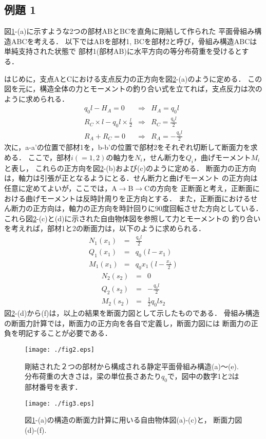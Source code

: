 ﻿\documentclass[10pt,a4j]{jbook}
\begin{document}
\subsection{例題 1}
図\ref{fig:fig12_2}-(a)に示すような2つの部材ABとBCを直角に剛結して作られた
平面骨組み構造ABCを考える．
以下ではABを部材1, BCを部材2と呼び，骨組み構造ABCは単純支持された状態で
部材1(部材AB)に水平方向の等分布荷重を受けるとする．

はじめに，支点AとCにおける支点反力の正方向を図\ref{fig:fig12_3}-(a)のように定める．
この図を元に，構造全体の力とモーメントの釣り合い式を立てれば，支点反力は次のように求められる．
\begin{eqnarray}
	q_0l-H_A=0 & \Rightarrow & H_A=q_0l \\ 
	R_C\times l -q_0l \times \frac{l}{2}
	 & \Rightarrow & R_C=\frac{q_0l}{2} \\ 
	R_A+R_C=0 &\Rightarrow& R_A=-\frac{q_0l}{2}
\end{eqnarray}
次に，a-a'の位置で部材1を，b-b'の位置で部材2をそれぞれ切断して断面力を求める．
ここで，部材$i(=1,2)$の軸力を$N_i$，せん断力を$Q_i$，曲げモーメント$M_i$と表し，
これらの正方向を図\ref{fig:fig12_3}-(b)および(c)のように定める．
断面力の正方向は，軸力は引張が正となるようにとる．せん断力と曲げモーメント
の正方向は任意に定めてよいが，ここでは，A$\rightarrow$B$\rightarrow$Cの方向を
正断面と考え，正断面における曲げモーメントは反時計周りを正方向とする．
また，正断面におけるせん断力の正方向は，軸力の正方向を時計回りに90度回転させた方向としている．
これら図\ref{fig:fig12_3}-(c)と(d)に示された自由物体図を参照して力とモーメントの
釣り合いを考えれば，部材1と2の断面力は，以下のように求められる．
\begin{eqnarray}
	N_1(x_1) &= & \frac{q_0l}{2}  
	\\
	Q_1(x_1) &= & q_0(l-x_1)
	\\
	M_1(x_1) &= & q_0x_1\left(l-\frac{x_1}{2}\right)
\end{eqnarray}
\begin{eqnarray}
	N_2(s_2) &= & 0
	\\
	Q_2(s_2) &= & -\frac{q_0l}{2}
	\\
	M_2(s_2) &= & \frac{1}{2}q_0ls_2
\end{eqnarray}
図\ref{fig:fig12_3}-(d)から(f)は，以上の結果を断面力図として示したものである．
骨組み構造の断面力計算では，断面力の正方向を各自で定義し，断面力図には
断面力の正負を明記することが必要である．
\begin{figure}[h]
	\begin{center}
	\texttt{[image: ./fig2.eps]} 
	\end{center}
	\caption{
		剛結された２つの部材から構成される静定平面骨組み構造(a)〜(e). 
		分布荷重の大きさは，梁の単位長さあたり$q_0$で，図中の数字1と2は部材番号を表す．
	} 
	\label{fig:fig12_2}
\end{figure}
\begin{figure}[h]
	\begin{center}
	\texttt{[image: ./fig3.eps]} 
	\end{center}
	\caption{
		図\ref{fig:fig12_2}-(a)の構造の断面力計算に用いる自由物体図(a)-(c)と，
		断面力図(d)-(f).
	} 
	\label{fig:fig12_3}
\end{figure}
\end{document}
